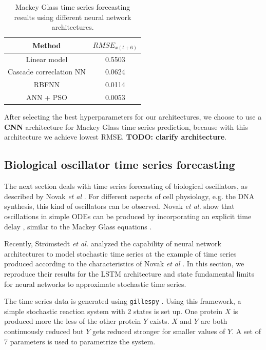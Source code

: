 \documentclass{article}
\begin{document}
\begin{table}
  \centering
  \begin{tabular}{c|c} 
    Method &  $RMSE_{x(t+6)}$ \\
    \hline
    Linear model & 0.5503 \\
    Cascade correclation NN & 0.0624 \\
    RBFNN & 0.0114 \\
    ANN + PSO \cite{caraballo2016} & 0.0053 \\
  \end{tabular}
  \caption{Mackey Glass time series forecasting results using different neural
  network architectures.}
  \label{tab:mackey_results}
\end{table}

After selecting the best hyperparameters for our architectures, we choose to 
use a \textbf{CNN} architecture for Mackey Glass time series prediction, 
because with this architecture we achieve lowest RMSE. \textbf{TODO: clarify
architecture}.

\subsection{Biological oscillator time series forecasting}

The next section deals with time series forecasting of biological oscillators, 
as described by Novak \textit{et al} \cite{novak2008}. For different aspects of
cell physiology, e.g. the DNA synthesis, this kind of oscillators can be 
observed. Novak \textit{et al.} show that oscillations in simple ODEs can be 
produced by incorporating an explicit time delay \cite{novak2008}, similar to 
the Mackey Glass equations \cite{mackey1977}.

Recently, Strömstedt \textit{et al.} analyzed the capability of neural network
architectures to model stochastic time series \cite{stroemstedt2018} at the 
example of time series produced according to the characteristics of Novak 
\textit{et al} \cite{novak2008}. In this section, we reproduce their results for
the LSTM architecture and state fundamental limits for neural networks to 
approximate stochastic time series.

The time series data is generated using \texttt{gillespy} \cite{abel2016}.
Using this framework, a simple stochastic reaction system with 2 states is 
set up. One protein $X$ is produced more the less of the other protein $Y$
exists. $X$ and $Y$ are both continuously reduced but $Y$ gets reduced stronger
for smaller values of $Y$. A set of 7 parameters is used to parametrize the 
system.
\end{document}
